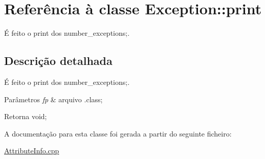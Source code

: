 \hypertarget{class_exception_1_1print}{}\section{Referência à classe Exception\+:\+:print}
\label{class_exception_1_1print}


É feito o print dos number\+\_\+exceptions;.  




\subsection{Descrição detalhada}
É feito o print dos number\+\_\+exceptions;. 


\begin{DoxyParams}{Parâmetros}
{\em fp} & arquivo .class; \\
\hline
\end{DoxyParams}
\begin{DoxyReturn}{Retorna}
void; 
\end{DoxyReturn}


A documentação para esta classe foi gerada a partir do seguinte ficheiro\+:\begin{DoxyCompactItemize}
\item 
\hyperlink{_attribute_info_8cpp}{Attribute\+Info.\+cpp}\end{DoxyCompactItemize}

